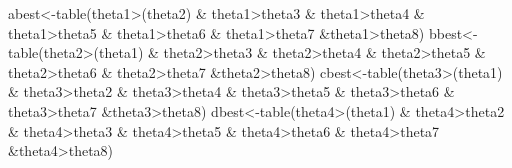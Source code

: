 \documentclass[
]{book}
\newenvironment{Shaded}{\begin{snugshade}}{\end{snugshade}}
\newcommand{\FunctionTok}[1]{\textcolor[rgb]{0.00,0.00,0.00}{#1}}
\newcommand{\NormalTok}[1]{#1}
\newcommand{\OtherTok}[1]{\textcolor[rgb]{0.56,0.35,0.01}{#1}}
\newcommand{\SpecialCharTok}[1]{\textcolor[rgb]{0.00,0.00,0.00}{#1}}
\theoremstyle{definition}
\theoremstyle{definition}
\theoremstyle{definition}
\theoremstyle{definition}
\theoremstyle{remark}
\begin{document}
\begin{Shaded}
\begin{Highlighting}[]
\NormalTok{  abest}\OtherTok{\textless{}{-}}\FunctionTok{table}\NormalTok{(theta1}\SpecialCharTok{\textgreater{}}\NormalTok{(theta2) }\SpecialCharTok{\&}\NormalTok{ theta1}\SpecialCharTok{\textgreater{}}\NormalTok{theta3 }\SpecialCharTok{\&}\NormalTok{ theta1}\SpecialCharTok{\textgreater{}}\NormalTok{theta4 }\SpecialCharTok{\&}\NormalTok{ theta1}\SpecialCharTok{\textgreater{}}\NormalTok{theta5 }\SpecialCharTok{\&}\NormalTok{ theta1}\SpecialCharTok{\textgreater{}}\NormalTok{theta6 }\SpecialCharTok{\&}\NormalTok{ theta1}\SpecialCharTok{\textgreater{}}\NormalTok{theta7 }\SpecialCharTok{\&}\NormalTok{theta1}\SpecialCharTok{\textgreater{}}\NormalTok{theta8)}
\NormalTok{  bbest}\OtherTok{\textless{}{-}}\FunctionTok{table}\NormalTok{(theta2}\SpecialCharTok{\textgreater{}}\NormalTok{(theta1) }\SpecialCharTok{\&}\NormalTok{ theta2}\SpecialCharTok{\textgreater{}}\NormalTok{theta3 }\SpecialCharTok{\&}\NormalTok{ theta2}\SpecialCharTok{\textgreater{}}\NormalTok{theta4 }\SpecialCharTok{\&}\NormalTok{ theta2}\SpecialCharTok{\textgreater{}}\NormalTok{theta5 }\SpecialCharTok{\&}\NormalTok{ theta2}\SpecialCharTok{\textgreater{}}\NormalTok{theta6 }\SpecialCharTok{\&}\NormalTok{ theta2}\SpecialCharTok{\textgreater{}}\NormalTok{theta7 }\SpecialCharTok{\&}\NormalTok{theta2}\SpecialCharTok{\textgreater{}}\NormalTok{theta8)}
\NormalTok{  cbest}\OtherTok{\textless{}{-}}\FunctionTok{table}\NormalTok{(theta3}\SpecialCharTok{\textgreater{}}\NormalTok{(theta1) }\SpecialCharTok{\&}\NormalTok{ theta3}\SpecialCharTok{\textgreater{}}\NormalTok{theta2 }\SpecialCharTok{\&}\NormalTok{ theta3}\SpecialCharTok{\textgreater{}}\NormalTok{theta4 }\SpecialCharTok{\&}\NormalTok{ theta3}\SpecialCharTok{\textgreater{}}\NormalTok{theta5 }\SpecialCharTok{\&}\NormalTok{ theta3}\SpecialCharTok{\textgreater{}}\NormalTok{theta6 }\SpecialCharTok{\&}\NormalTok{ theta3}\SpecialCharTok{\textgreater{}}\NormalTok{theta7 }\SpecialCharTok{\&}\NormalTok{theta3}\SpecialCharTok{\textgreater{}}\NormalTok{theta8)}
\NormalTok{  dbest}\OtherTok{\textless{}{-}}\FunctionTok{table}\NormalTok{(theta4}\SpecialCharTok{\textgreater{}}\NormalTok{(theta1) }\SpecialCharTok{\&}\NormalTok{ theta4}\SpecialCharTok{\textgreater{}}\NormalTok{theta2 }\SpecialCharTok{\&}\NormalTok{ theta4}\SpecialCharTok{\textgreater{}}\NormalTok{theta3 }\SpecialCharTok{\&}\NormalTok{ theta4}\SpecialCharTok{\textgreater{}}\NormalTok{theta5 }\SpecialCharTok{\&}\NormalTok{ theta4}\SpecialCharTok{\textgreater{}}\NormalTok{theta6 }\SpecialCharTok{\&}\NormalTok{ theta4}\SpecialCharTok{\textgreater{}}\NormalTok{theta7 }\SpecialCharTok{\&}\NormalTok{theta4}\SpecialCharTok{\textgreater{}}\NormalTok{theta8)}

\end{Highlighting}
\end{Shaded}
\end{document}
